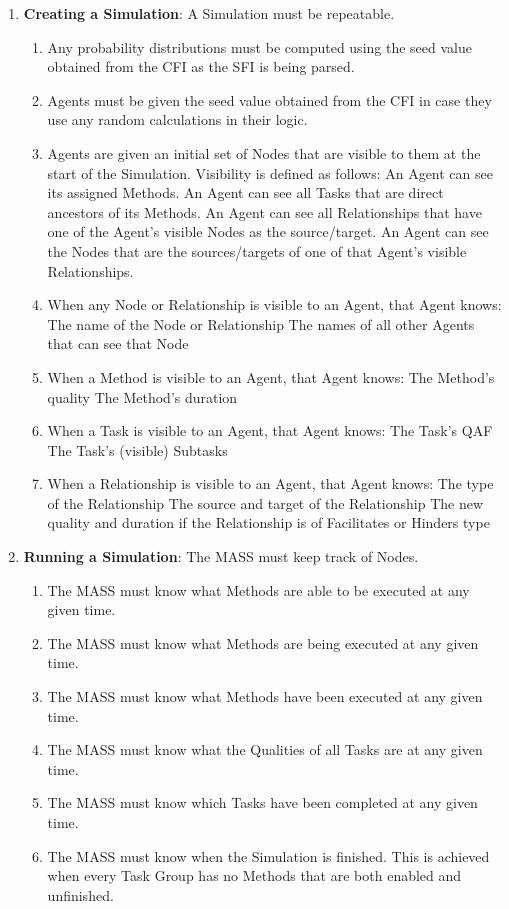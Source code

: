 \begin{enumerate}
  \item\textbf{Creating a Simulation}: A Simulation must be repeatable.
   \begin{enumerate}
    \item Any probability distributions must be computed using the seed value obtained from the CFI as the SFI is being parsed.
    \item Agents must be given the seed value obtained from the CFI in case they use any random calculations in their logic.
    \item Agents are given an initial set of Nodes that are visible to them at the start of the Simulation. Visibility is defined as follows:
    	\subitem An Agent can see its assigned Methods.
    	\subitem An Agent can see all Tasks that are direct ancestors of its Methods.
    	\subitem An Agent can see all Relationships that have one of the Agent's visible Nodes as the source/target.
    	\subitem An Agent can see the Nodes that are the sources/targets of one of that Agent's visible Relationships.
    \item When any Node or Relationship is visible to an Agent, that Agent knows:
    	\subitem The name of the Node or Relationship
    	\subitem The names of all other Agents that can see that Node
    \item When a Method is visible to an Agent, that Agent knows:
   	\subitem The Method's quality
	\subitem The Method's duration
    \item When a Task is visible to an Agent, that Agent knows:
   	\subitem The Task's QAF
   	\subitem The Task's (visible) Subtasks
    \item When a Relationship is visible to an Agent, that Agent knows:
    	\subitem The type of the Relationship
    	\subitem The source and target of the Relationship
    	\subitem The new quality and duration if the Relationship is of Facilitates or Hinders type
  \end{enumerate}
  
  \item\textbf{Running a Simulation}: The MASS must keep track of Nodes.
    \begin{enumerate}
    \item The MASS must know what Methods are able to be executed at any given time.
    \item The MASS must know what Methods are being executed at any given time.
    \item The MASS must know what Methods have been executed at any given time.
    \item The MASS must know what the Qualities of all Tasks are at any given time.
    \item The MASS must know which Tasks have been completed at any given time.
    \item The MASS must know when the Simulation is finished. This is achieved when every Task Group has no Methods that are both enabled and unfinished.
  \end{enumerate}
  

\end{enumerate}
